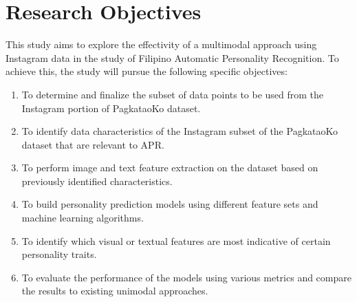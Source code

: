 




\section{Research Objectives}
\label{sec: objectives}
This study aims to explore the effectivity of a multimodal approach using Instagram data in the study of Filipino Automatic Personality Recognition. To achieve this, the study will pursue the following specific objectives:

\begin{enumerate}
	\item To determine and finalize the subset of data points to be used from the Instagram portion of PagkataoKo dataset.
 
	\item To identify data characteristics of the Instagram subset of the PagkataoKo dataset that are relevant to APR.

	\item To perform image and text feature extraction on the dataset based on previously identified characteristics.

	\item To build personality prediction models using different feature sets and machine learning algorithms.

 	\item To identify which visual or textual features are most indicative of certain personality traits.

	\item To evaluate the performance of the models using various metrics and compare the results to existing unimodal approaches.
\end{enumerate}


